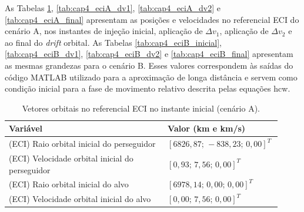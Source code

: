 
\label{ap:ApendiceA}

As Tabelas \ref{tab:cap4_eciA_inicial}, \ref{tab:cap4_eciA_dv1}, \ref{tab:cap4_eciA_dv2} e \ref{tab:cap4_eciA_final}
apresentam as posições e velocidades no referencial ECI do cenário A, nos instantes de injeção inicial, aplicação de $\Delta v_1$,
aplicação de $\Delta v_2$ e ao final do \emph{drift} orbital.
As Tabelas \ref{tab:cap4_eciB_inicial}, \ref{tab:cap4_eciB_dv1}, \ref{tab:cap4_eciB_dv2} e \ref{tab:cap4_eciB_final}
apresentam as mesmas grandezas para o cenário B.
Esses valores correspondem às saídas do código MATLAB utilizado para a aproximação de longa distância e servem como condição inicial para a fase de movimento relativo descrita pelas equações \gls{hcw}.


\begin{table}[H]
\centering
\caption{Vetores orbitais no referencial ECI no instante inicial (cenário A).}
\label{tab:cap4_eciA_inicial}
\begingroup
\small
\setlength{\tabcolsep}{4pt}
\renewcommand{\arraystretch}{1.15}
\begin{tabular}{|p{0.58\linewidth}|p{0.34\linewidth}|}
\hline
Variável & Valor (km e km/s)\\
\hline
(ECI) Raio orbital inicial do perseguidor &
$\left[6826,87;\,-838,23;\,0,00\right]^T$\\
\hline
(ECI) Velocidade orbital inicial do perseguidor &
$\left[0,93;\,7,56;\,0,00\right]^T$\\
\hline
(ECI) Raio orbital inicial do alvo &
$\left[6978,14;\,0,00;\,0,00\right]^T$\\
\hline
(ECI) Velocidade orbital inicial do alvo &
$\left[0,00;\,7,56;\,0,00\right]^T$\\
\hline
\end{tabular}
\endgroup
\end{table}

